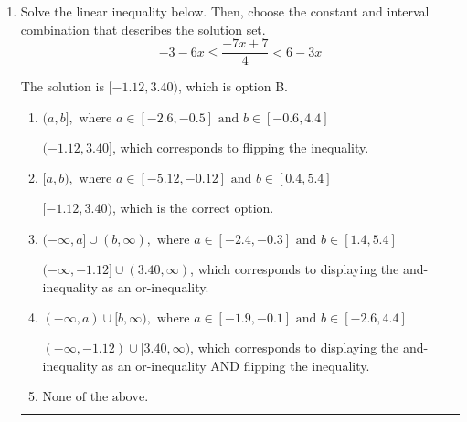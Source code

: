 \documentclass{extbook}[14pt]
\newcommand{\litem}[1]{\item #1

\rule{\textwidth}{0.4pt}}
\begin{document}
\begin{enumerate}
{The solution is \( \text{None of the above} \), which is option E.\begin{enumerate}[label=\Alph*.]
\item \( [1, 7] \)

This describes the values no more than 3 from 4
\item \( (-\infty, 1) \cup (7, \infty) \)

This describes the values more than 3 from 4
\item \( (1, 7) \)

This describes the values less than 3 from 4
\item \( (-\infty, 1] \cup [7, \infty) \)

This describes the values no less than 3 from 4
\item \( \text{None of the above} \)

Options A-D described the values [more/less than] 3 units from 4, which is the reverse of what the question asked.
\end{enumerate}

\textbf{General Comment:} When thinking about this language, it helps to draw a number line and try points.
}
\litem{
Solve the linear inequality below. Then, choose the constant and interval combination that describes the solution set.
\[ -3 - 6 x \leq \frac{-7 x + 7}{4} < 6 - 3 x \]

The solution is \( [-1.12, 3.40) \), which is option B.\begin{enumerate}[label=\Alph*.]
\item \( (a, b], \text{ where } a \in [-2.6, -0.5] \text{ and } b \in [-0.6, 4.4] \)

$(-1.12, 3.40]$, which corresponds to flipping the inequality.
\item \( [a, b), \text{ where } a \in [-5.12, -0.12] \text{ and } b \in [0.4, 5.4] \)

$[-1.12, 3.40)$, which is the correct option.
\item \( (-\infty, a] \cup (b, \infty), \text{ where } a \in [-2.4, -0.3] \text{ and } b \in [1.4, 5.4] \)

$(-\infty, -1.12] \cup (3.40, \infty)$, which corresponds to displaying the and-inequality as an or-inequality.
\item \( (-\infty, a) \cup [b, \infty), \text{ where } a \in [-1.9, -0.1] \text{ and } b \in [-2.6, 4.4] \)

$(-\infty, -1.12) \cup [3.40, \infty)$, which corresponds to displaying the and-inequality as an or-inequality AND flipping the inequality.
\item \( \text{None of the above.} \)



\end{enumerate}}
\end{enumerate}
\end{document}
